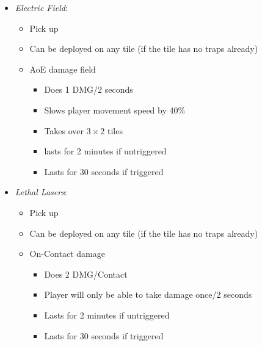 \documentclass[14pt]{report}
\begin{document}
\begin{itemize}
    \begin{itemize}
        \item \emph{Electric Field}:
        \begin{itemize}
            \item Pick up
            \item Can be deployed on any tile (if the tile has no traps already)
            \item AoE damage field
            \begin{itemize}
                \item Does 1 DMG/2 seconds
                \item Slows player movement speed by 40\%
                \item Takes over \(3\times2\) tiles
                \item lasts for 2 minutes if untriggered
                \item Lasts for 30 seconds if triggered
            \end{itemize}
        \end{itemize}
        \item \emph{Lethal Lasers}:
        \begin{itemize}
            \item Pick up
            \item Can be deployed on any tile (if the tile has no traps already)
            \item On-Contact damage
            \begin{itemize}
                \item Does 2 DMG/Contact
                \item Player will only be able to take damage once/2 seconds
                \item Lasts for 2 minutes if untriggered
                \item Lasts for 30 seconds if triggered
            \end{itemize}
        \end{itemize}
    \end{itemize}
\end{itemize}
\end{document}
